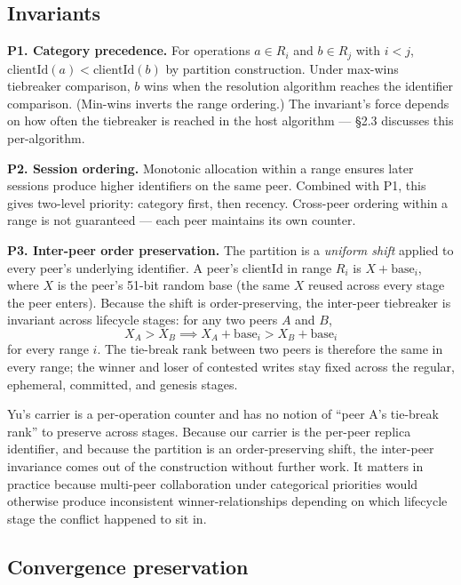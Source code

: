 \subsection{Invariants}

\textbf{P1. Category precedence.} For operations $a \in R_i$ and $b \in R_j$ with $i < j$, $\mathrm{clientId}(a) < \mathrm{clientId}(b)$ by partition construction. Under max-wins tiebreaker comparison, $b$ wins when the resolution algorithm reaches the identifier comparison. (Min-wins inverts the range ordering.) The invariant's force depends on how often the tiebreaker is reached in the host algorithm --- §2.3 discusses this per-algorithm.

\textbf{P2. Session ordering.} Monotonic allocation within a range ensures later sessions produce higher identifiers on the same peer. Combined with P1, this gives two-level priority: category first, then recency. Cross-peer ordering within a range is not guaranteed --- each peer maintains its own counter.

\textbf{P3. Inter-peer order preservation.} The partition is a \emph{uniform shift} applied to every peer's underlying identifier. A peer's clientId in range $R_i$ is $X + \mathrm{base}_i$, where $X$ is the peer's 51-bit random base (the same $X$ reused across every stage the peer enters). Because the shift is order-preserving, the inter-peer tiebreaker is invariant across lifecycle stages: for any two peers $A$ and $B$,
\[
X_A > X_B \implies X_A + \mathrm{base}_i > X_B + \mathrm{base}_i
\]
for every range $i$.
The tie-break rank between two peers is therefore the same in every range; the winner and loser of contested writes stay fixed across the regular, ephemeral, committed, and genesis stages.

Yu's carrier is a per-operation counter and has no notion of ``peer A's tie-break rank'' to preserve across stages. Because our carrier is the per-peer replica identifier, and because the partition is an order-preserving shift, the inter-peer invariance comes out of the construction without further work. It matters in practice because multi-peer collaboration under categorical priorities would otherwise produce inconsistent winner-relationships depending on which lifecycle stage the conflict happened to sit in.

\subsection{Convergence preservation}

